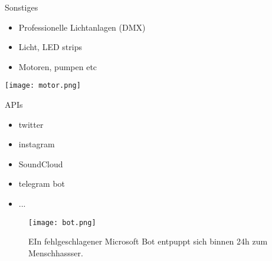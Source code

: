 \begin{frame}{Sonstiges}
\begin{itemize}
	\item Professionelle Lichtanlagen (DMX)
	\item Licht, LED strips
	\item Motoren, pumpen etc
\end{itemize}

\begin{center}
\texttt{[image: motor.png]}
\end{center}
\end{frame}


\begin{frame}{APIs}
\begin{itemize}
	\item twitter
	\item instagram
	\item SoundCloud
	\item telegram bot
	\item ...
\end{itemize}

\begin{center}
\begin{figure}
\texttt{[image: bot.png]}
\caption{EIn fehlgeschlagener Microsoft Bot entpuppt sich binnen 24h zum Menschhassser.}
\end{figure}
\end{center}


\end{frame}



